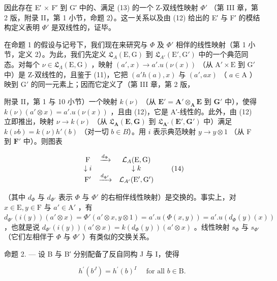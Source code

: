 因此存在 E′ × F′ 到 G′ 中的、满足 (13) 的一个 Z-双线性映射 \(\Phi'\) （第 III 章，第 2 版，附录 II，第 1 小节，命题 2）。这一关系以及由 (12) 给出的 E′ 与 F′ 的模结构定义表明 \(\Phi'\) 是双线性的，证毕。

在命题 1 的假设与记号下，我们现在来研究与 \(\Phi\) 及 \(\Phi'\) 相伴的线性映射（第 1 小节，定义 2）。为此，我们先定义 \(\mathfrak{L}_{A}(\mathrm{E}, \mathrm{G})\) 到 \(\mathfrak{L}_{A'}(\mathrm{E}', \mathrm{G}')\) 中的一个典范同态。对每个 \(\nu \in \mathfrak{L}_{\Lambda}(\mathrm{E}, \mathrm{G})\) ，映射 \((a', x) \to a'. u(\nu(x))\) （从 \(\mathrm{A}' \times \mathrm{E}\) 到 \(\mathrm{G}'\) 中）是 Z-双线性的，且鉴于 (11)，它把 \((a'h(a), x)\) 与 \((a', ax)\) （ \(a \in \mathrm{A}\) ）映到 \(\mathrm{G}'\) 的同一元素上；因而它定义了（第 III 章，第 2 版，

附录 II，第 1 与 10 小节）一个映射 \(k(\nu)\) （从 \(\mathbf{E}' = \mathbf{A}' \otimes_{\mathbf{A}} \mathbf{E}\) 到 \(\mathbf{G}'\) 中），使得 \(k(\nu)(a' \otimes x) = a'. u(\nu(x))\) ，且由 (12)，它是 A′-线性的。此外，由 (12) 立即推出，映射 \(\nu \to k(\nu)\) （从 \(\mathfrak{L}_{\mathbf{A}}(\mathbf{E}, \mathbf{G})\) 到 \(\mathfrak{L}_{\mathbf{A}'}(\mathbf{E}', \mathbf{G}')\) 中）满足 \(k(\nu b) = k(\nu) h'(b)\) （对一切 \(b \in B\)）。用 \(i\) 表示典范映射 \(y \to y \otimes 1\) （从 F 到 \(\mathbf{F}'\) 中）。则图表

\[
\begin{array}{c c c} \mathrm{F} & \xrightarrow {d _ {\Phi}} & \mathcal {L} _ {A} (\mathrm{E}, \mathrm{G}) \\ \downarrow i & & \downarrow k \\ \mathrm{F} ^ {\prime} & \xrightarrow {d _ {\Phi^ {\prime}}} & \mathcal {L} _ {A^{\prime}} (\mathrm{E} ^ {\prime}, \mathrm{G} ^ {\prime}) \end{array}\tag{14}
\]

（其中 \(d_{\Phi}\) 与 \(d_{\Phi'}\) 表示 \(\Phi\) 与 \(\Phi'\) 的右相伴线性映射）是交换的。事实上，对 \(x \in \mathrm{E}, y \in \mathrm{F}\) 与 \(a' \in \mathrm{A}'\) ，有 \(d_{\Phi'}(i(y))(a' \otimes x) = \Phi'(a' \otimes x, y \otimes 1) = a'. u(\Phi(x, y)) = a'. u(d_{\Phi}(y)(x))\) ，也就是说 \(d_{\Phi'}(i(y))(a' \otimes x) = k(d_{\Phi}(y))(a' \otimes x)\) 。线性映射 \(s_{\Phi}\) 与 \(s_{\Phi'}\) （它们左相伴于 \(\Phi\) 与 \(\Phi'\) ）有类似的交换关系。

命题 2. --- 设 B 与 B′ 分别配备了反自同构 J 与 I，使得

\[
h ^ {\prime} (b ^ {J}) = h ^ {\prime} (b) ^ {I} \quad \text { for all } b \in \mathrm{B}.\tag{15}
\]

